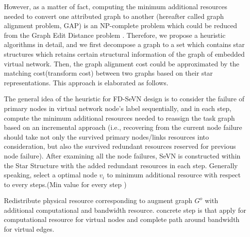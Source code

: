 However, as a matter of fact, computing the minimum additional resources needed to convert one attributed graph to another (hereafter called graph alignment problem, GAP) is an NP-complete problem which could be reduced from the Graph Edit Distance problem \cite{justice2006binary}. Therefore, we propose a heuristic algorithms in detail, and we first decompose a graph to a set which contains star structures which retains certain structural information of the graph of embedded virtual network. Then, the graph alignment cost could be approximated by the matching cost(transform cost) between two graphs based on their star representations. This approach is elaborated as follows.


The general idea of the heuristic for FD-SeVN design is to consider the failure of primary nodes in virtual network node's label sequentially, and in each step, compute the minimum additional resources needed to reassign the task graph based on an incremental approach (i.e., recovering from the current node failure should take not only the survived primary nodes/links resources into consideration, but also the survived redundant resources reserved for previous node failure). After examining all the node failures, SeVN is constructed within the Star Structure with the added redundant resources in each step. Generally speaking, select a optimal node $v_i$ to minimum additional resource with respect to every steps.(Min value for every step )



Redistribute physical resource corresponding to augment graph $G^o$  with additional computational and bandwidth resource. concrete step is that apply for computational resource for virtual nodes and complete path around bandwidth for virtual edges.




